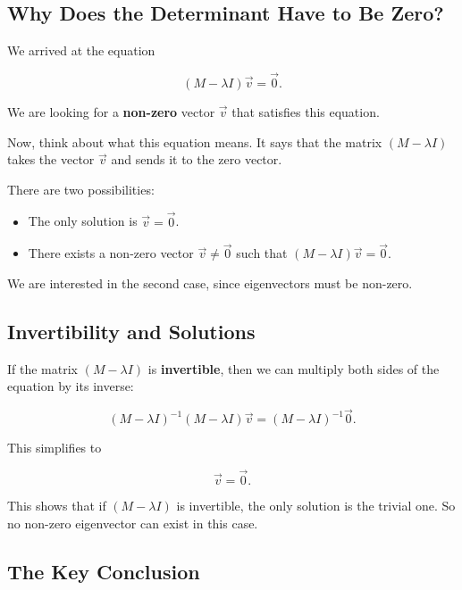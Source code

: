 \documentclass[11pt,openany]{book}
\theoremstyle{definition}
\begin{document}
\subsection{Why Does the Determinant Have to Be Zero?}

We arrived at the equation

\[
(M - \lambda I)\vec{v} = \vec{0}.
\]

We are looking for a \textbf{non-zero} vector $\vec{v}$ that satisfies this equation.

\medskip

Now, think about what this equation means. It says that the matrix $(M - \lambda I)$ 
takes the vector $\vec{v}$ and sends it to the zero vector.

\medskip

There are two possibilities:

\begin{itemize}
  \item The only solution is $\vec{v} = \vec{0}$.
  \item There exists a non-zero vector $\vec{v} \neq \vec{0}$ such that $(M - \lambda I)\vec{v} = \vec{0}$.
\end{itemize}

\medskip

We are interested in the second case, since eigenvectors must be non-zero.

\medskip

\subsection{Invertibility and Solutions}

If the matrix $(M - \lambda I)$ is \textbf{invertible}, then we can multiply both sides of the equation by its inverse:

\[
(M - \lambda I)^{-1}(M - \lambda I)\vec{v} = (M - \lambda I)^{-1}\vec{0}.
\]

This simplifies to

\[
\vec{v} = \vec{0}.
\]

\medskip

This shows that if $(M - \lambda I)$ is invertible, the only solution is the trivial one. 
So no non-zero eigenvector can exist in this case.

\medskip

\subsection{The Key Conclusion}
\end{document}
